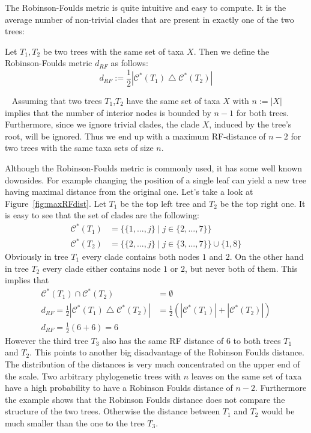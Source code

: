 The Robinson-Foulds metric is quite intuitive and easy to compute. It is the average number of non-trivial clades that are present in exactly one of the two trees:
\begin{defin}
Let $T_1,T_2$ be two trees with the same set of taxa $X$. Then we define the Robinson-Foulds metric $d_{RF}$ as follows:
\[ d_{RF} := \frac{1}{2}|\mathcal{C}^*(T_1) \bigtriangleup \mathcal{C}^*(T_2)| \]
\end{defin}
\begin{rem}~\label{rem:n-2clades}
Assuming that two trees $T_1$,$T_2$ have the same set of taxa $X$ with $n:= |X|$ implies that the number of interior nodes is bounded by $n-1$ for both trees. Furthermore, since we ignore trivial clades, the clade $X$, induced by the tree's root, will be ignored. Thus we end up with a maximum RF-distance of $n-2$ for two trees with the same taxa sets of size $n$.
\end{rem}
Although the Robinson-Foulds metric is commonly used, it has some well known downsides. For example changing the position of a single leaf can yield a new tree having maximal distance from the original one. Let's take a look at Figure~\ref{fig:maxRFdist}. Let $T_1$ be the top left tree and $T_2$ be the top right one. It is easy to see that the set of clades are the following:
\begin{align*}
\mathcal{C}^*(T_1) &=\{ \{1,...,j\}\;|\;j\in \{2,...,7\}\} \\
\mathcal{C}^*(T_2) &=\{ \{2,...,j\}\;|\;j\in \{3,...,7\}\} \cup \{1,8\}
\end{align*}
Obviously in tree $T_1$ every clade contains both nodes $1$ and $2$. On the other hand in tree $T_2$ every clade either contains node $1$ or $2$, but never both of them. This implies that 
\begin{align*}
\mathcal{C}^*(T_1) \cap \mathcal{C}^*(T_2) &= \emptyset \\
d_{RF} = \frac{1}{2}|\mathcal{C}^*(T_1) \bigtriangleup \mathcal{C}^*(T_2)| &= \frac{1}{2}(|\mathcal{C}^*(T_1)| + |\mathcal{C}^*(T_2)|) \\
d_{RF} = \frac{1}{2}(6 + 6) = 6
\end{align*}
However the third tree $T_3$ also has the same RF distance of $6$ to both trees $T_1$ and $T_2$. This points to another big disadvantage of the Robinson Foulds distance. The distribution of the distances is very much concentrated on the upper end of the scale. Two arbitrary phylogenetic trees with $n$ leaves on the same set of taxa have a high probability to have a Robinson Foulds distance of $n-2$. Furthermore the example shows that the Robinson Foulds distance does not compare the structure of the two trees. Otherwise the distance between $T_1$ and $T_2$ would be much smaller than the one to the tree $T_3$. 
